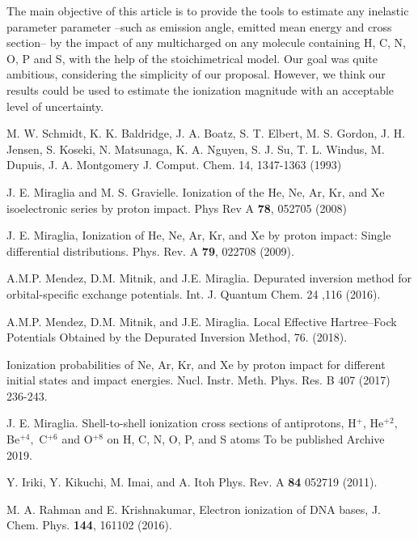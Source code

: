 \documentclass[preprint,12pt]{article}
\begin{document}
The main objective of this article is to provide the tools to estimate 
any inelastic parameter parameter --such as emission angle, emitted mean 
energy and cross section-- by the impact of any multicharged on any 
molecule containing H, C, N, O, P and S, with the help of the 
stoichimetrical model. Our goal was quite ambitious, considering the 
simplicity of our proposal. However, we think our results could be used 
to estimate the ionization magnitude with an acceptable level of 
uncertainty.

\bigskip

\begin{thebibliography}{99}

M. W. Schmidt, K. K. Baldridge, J. A. Boatz, S. T. Elbert, M. S. Gordon, 
J. H. Jensen, S. Koseki, N. Matsunaga, K. A. Nguyen, S. J. Su, T. L. Windus, 
M. Dupuis, J. A. Montgomery 
J. Comput. Chem. 14, 1347-1363 (1993)

J. E. Miraglia and M. S. Gravielle. Ionization of the
He, Ne, Ar, Kr, and Xe isoelectronic series by proton impact. 
Phys Rev A \textbf{78}, 052705 (2008)

J. E. Miraglia, Ionization of He, Ne, Ar, Kr, and Xe
by proton impact: Single differential distributions. 
Phys. Rev. A \textbf{79}, 022708 (2009).

A.M.P. Mendez, D.M. Mitnik, and J.E. Miraglia.
Depurated inversion method for orbital-specific exchange potentials. 
Int. J. Quantum Chem. 24 ,116 (2016).

A.M.P. Mendez, D.M. Mitnik, and J.E. Miraglia. Local Effective 
Hartree--Fock Potentials Obtained by the Depurated Inversion Method,
76. (2018).

Ionization probabilities of Ne, Ar, Kr, and Xe by
proton impact for different initial states and impact energies. 
Nucl. Instr. Meth. Phys. Res. B 407 (2017) 236-243.

J. E. Miraglia. Shell-to-shell ionization cross
sections of antiprotons, H$^{+}$, He$^{+2},$ Be$^{+4},$ C$^{+6}$ and 
O$^{+8}$ on H, C, N, O, P, and S atoms To be published Archive 2019.

Y. Iriki, Y. Kikuchi, M. Imai, and A. Itoh
Phys. Rev. A \textbf{84} 052719 (2011).

M. A. Rahman and E. Krishnakumar,
Electron ionization of DNA bases,
J. Chem. Phys. \textbf{144}, 161102 (2016).


\end{thebibliography}
\end{document}
